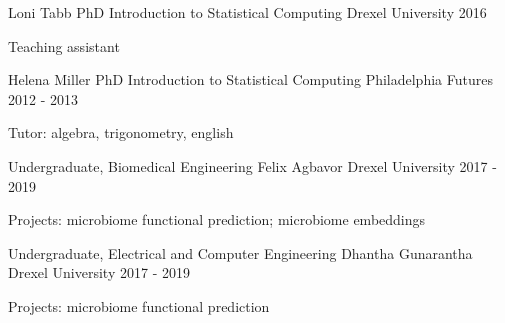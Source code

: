 \begin{cventries}
\cventry
    {Loni Tabb PhD}
    {Introduction to Statistical Computing}
    {Drexel University}
    {2016}
    {\begin{cvitems}
        \item Teaching assistant
    \end{cvitems}}
    
\cventry
    {Helena Miller PhD}
    {Introduction to Statistical Computing}
    {Philadelphia Futures}
    {2012 - 2013}
    {\begin{cvitems}
        \item Tutor: algebra, trigonometry, english 
    \end{cvitems}}

\end{cventries}


\begin{cventries}

\cventry
    {Undergraduate, Biomedical Engineering}
    {Felix Agbavor}
    {Drexel University}
    {2017 - 2019}
    {\begin{cvitems}
        \item Projects: microbiome functional prediction; microbiome embeddings
    \end{cvitems}}

\cventry
    {Undergraduate, Electrical and Computer Engineering}
    {Dhantha Gunarantha}
    {Drexel University}
    {2017 - 2019}
    {\begin{cvitems}
        \item Projects: microbiome functional prediction
    \end{cvitems}}
    
\end{cventries}
    



